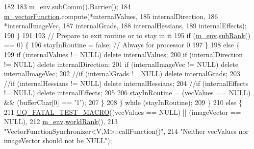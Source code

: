 \begin{DoxyCode}
182 
183         \hyperlink{class_q_u_e_s_o_1_1_vector_function_synchronizer_a36c2a9e1a2d317dddb5cf51b68e5c659}{m\_env}.\hyperlink{class_q_u_e_s_o_1_1_base_environment_affe39f53e3d5d678842413370af09145}{subComm}().\hyperlink{class_q_u_e_s_o_1_1_mpi_comm_a4059971c30e023b272fccaa6aa00c426}{Barrier}();
184         \hyperlink{class_q_u_e_s_o_1_1_vector_function_synchronizer_abde0efa4a6ab11898d8b0b0853d0971a}{m\_vectorFunction}.compute(*internalValues,
185                                  internalDirection,
186                                  *internalImageVec,
187                                  internalGrads,
188                                  internalHessians,
189                                  internalEffects);
190       \}
191 
193       \textcolor{comment}{// Prepare to exit routine or to stay in it}
195 \textcolor{comment}{}      \textcolor{keywordflow}{if} (\hyperlink{class_q_u_e_s_o_1_1_vector_function_synchronizer_a36c2a9e1a2d317dddb5cf51b68e5c659}{m\_env}.\hyperlink{class_q_u_e_s_o_1_1_base_environment_a172d52f993f1322ed45aaddf71518dbb}{subRank}() == 0) \{
196         stayInRoutine = \textcolor{keyword}{false}; \textcolor{comment}{// Always for processor 0}
197       \}
198       \textcolor{keywordflow}{else} \{
199         \textcolor{keywordflow}{if} (internalValues    != NULL) \textcolor{keyword}{delete} internalValues;
200         \textcolor{keywordflow}{if} (internalDirection != NULL) \textcolor{keyword}{delete} internalDirection;
201         \textcolor{keywordflow}{if} (internalImageVec  != NULL) \textcolor{keyword}{delete} internalImageVec;
202       \textcolor{comment}{//if (internalGrads     != NULL) delete internalGrads;}
203       \textcolor{comment}{//if (internalHessians  != NULL) delete internalHessians;}
204       \textcolor{comment}{//if (internalEffects   != NULL) delete internalEffects;}
205 
206         stayInRoutine = (vecValues == NULL) && (bufferChar[0] == \textcolor{charliteral}{'1'});
207       \}
208     \} \textcolor{keywordflow}{while} (stayInRoutine);
209   \}
210   \textcolor{keywordflow}{else} \{
211     \hyperlink{_defines_8h_a56d63d18d0a6d45757de47fcc06f574d}{UQ\_FATAL\_TEST\_MACRO}((vecValues == NULL) || (imageVector == NULL),
212                         \hyperlink{class_q_u_e_s_o_1_1_vector_function_synchronizer_a36c2a9e1a2d317dddb5cf51b68e5c659}{m\_env}.\hyperlink{class_q_u_e_s_o_1_1_base_environment_a78b57112bbd0e6dd0e8afec00b40ffa7}{worldRank}(),
213                         \textcolor{stringliteral}{"VectorFunctionSynchronizer<V,M>::callFunction()"},
214                         \textcolor{stringliteral}{"Neither vecValues nor imageVector should not be NULL"});

\end{DoxyCode}
